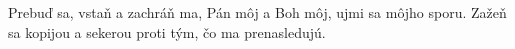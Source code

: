 Prebuď sa, vstaň a zachráň ma,
Pán môj a Boh môj, ujmi sa môjho sporu.
\versseparator
Zažeň sa kopijou a sekerou
proti tým, čo ma prenasledujú.